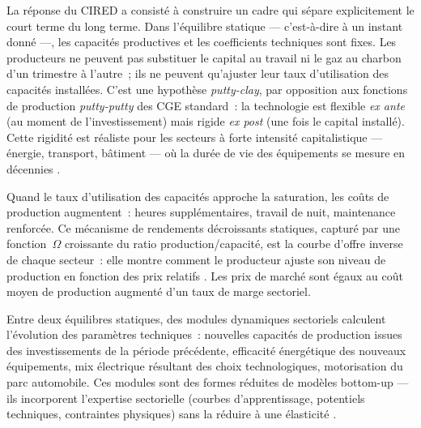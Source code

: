 La réponse du CIRED a consisté à construire un cadre qui sépare explicitement le court terme du long terme. Dans l'équilibre statique --- c'est-à-dire à un instant donné ---, les capacités productives et les coefficients techniques sont fixes. Les producteurs ne peuvent pas substituer le capital au travail ni le gaz au charbon d'un trimestre à l'autre~; ils ne peuvent qu'ajuster leur taux d'utilisation des capacités installées. C'est une hypothèse \emph{putty-clay}, par opposition aux fonctions de production \emph{putty-putty} des CGE standard~: la technologie est flexible \emph{ex ante} (au moment de l'investissement) mais rigide \emph{ex post} (une fois le capital installé). Cette rigidité est réaliste pour les secteurs à forte intensité capitalistique --- énergie, transport, bâtiment --- où la durée de vie des équipements se mesure en décennies \parencite{johansen_substitution_1959}.

Quand le taux d'utilisation des capacités approche la saturation, les coûts de production augmentent~: heures supplémentaires, travail de nuit, maintenance renforcée. Ce mécanisme de rendements décroissants statiques, capturé par une fonction~$\Omega$ croissante du ratio production/capacité, est la courbe d'offre inverse de chaque secteur~: elle montre comment le producteur ajuste son niveau de production en fonction des prix relatifs \parencite{corrado_capacity_1997}. Les prix de marché sont égaux au coût moyen de production augmenté d'un taux de marge sectoriel.

Entre deux équilibres statiques, des modules dynamiques sectoriels calculent l'évolution des paramètres techniques~: nouvelles capacités de production issues des investissements de la période précédente, efficacité énergétique des nouveaux équipements, mix électrique résultant des choix technologiques, motorisation du parc automobile. Ces modules sont des \og formes réduites\fg{} de modèles bottom-up --- ils incorporent l'expertise sectorielle (courbes d'apprentissage, potentiels techniques, contraintes physiques) sans la réduire à une élasticité \parencite{sassi_imaclim-r_2010}.

